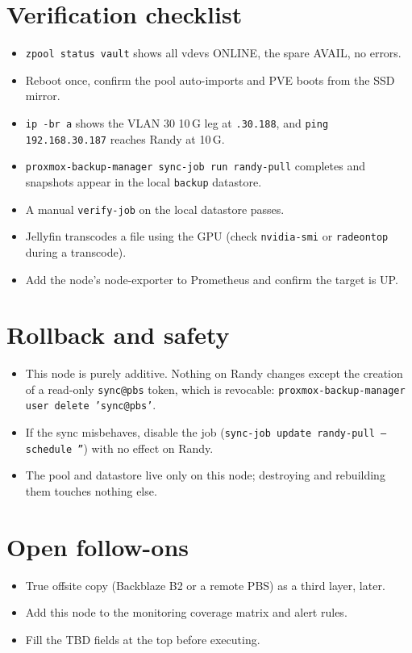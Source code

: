 \documentclass[11pt]{article}
\begin{document}
\section{Verification checklist}
\begin{itemize}
  \item \texttt{zpool status vault} shows all vdevs ONLINE, the spare AVAIL, no errors.
  \item Reboot once, confirm the pool auto-imports and PVE boots from the SSD mirror.
  \item \texttt{ip -br a} shows the VLAN 30 10\,G leg at \texttt{.30.188}, and \texttt{ping
  192.168.30.187} reaches Randy at 10\,G.
  \item \texttt{proxmox-backup-manager sync-job run randy-pull} completes and snapshots appear in
  the local \texttt{backup} datastore.
  \item A manual \texttt{verify-job} on the local datastore passes.
  \item Jellyfin transcodes a file using the GPU (check \texttt{nvidia-smi} or \texttt{radeontop}
  during a transcode).
  \item Add the node's node-exporter to Prometheus and confirm the target is UP.
\end{itemize}

\section{Rollback and safety}
\begin{itemize}
  \item This node is purely additive. Nothing on Randy changes except the creation of a
  read-only \texttt{sync@pbs} token, which is revocable: \texttt{proxmox-backup-manager user
  delete 'sync@pbs'}.
  \item If the sync misbehaves, disable the job (\texttt{sync-job update randy-pull --schedule
  ''}) with no effect on Randy.
  \item The pool and datastore live only on this node; destroying and rebuilding them touches
  nothing else.
\end{itemize}

\section{Open follow-ons}
\begin{itemize}
  \item True offsite copy (Backblaze B2 or a remote PBS) as a third layer, later.
  \item Add this node to the monitoring coverage matrix and alert rules.
  \item Fill the TBD fields at the top before executing.
\end{itemize}
\end{document}
